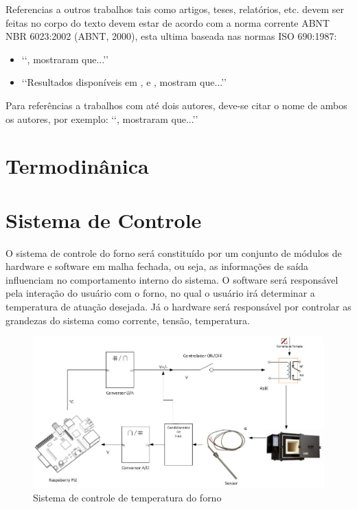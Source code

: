 Referencias a outros trabalhos tais como artigos, teses, relatórios, etc. devem 
ser feitas no corpo do texto devem estar de acordo com a norma corrente ABNT 
NBR 6023:2002 (ABNT, 2000), esta ultima baseada nas normas ISO 690:1987:
\begin{itemize}
	\item \lq\lq \cite{bordalo1989}, mostraram que...\rq\rq

	\item \lq\lq Resultados disponíveis em \cite{coimbra1978}, \cite{clark1986} 
	e \cite{sparrow1980}, mostram que...\rq\rq
\end{itemize}

Para referências a trabalhos com até dois autores, deve-se citar o nome de 
ambos os autores, por exemplo: \lq\lq \cite{soviero1997}, mostraram 
que...\rq\rq

\section{Termodinânica}

\section{Sistema de Controle}

O sistema de controle do forno será constituído por um conjunto de módulos de hardware e software em malha fechada, ou seja, as informações de saída influenciam no comportamento interno do sistema. O software será responsável pela interação do usuário com o forno, no qual o usuário irá determinar a temperatura de atuação desejada. Já o hardware será responsável por controlar as grandezas do sistema como corrente, tensão, temperatura.

\begin{figure}[h]
	\centering
	\label{diagrama}
	\includegraphics[keepaspectratio=true,scale=0.5]{figuras/diagrama.jpg}
	\caption{Sistema de controle de temperatura do forno}
\end{figure}

